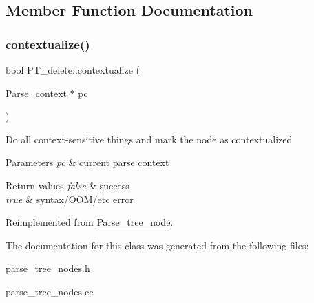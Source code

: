 \subsection{Member Function Documentation}
\mbox{\label{classPT__delete_af4282b73da9ec50c66c814422e7deb06}} 
\subsubsection{\texorpdfstring{contextualize()}{contextualize()}}
{\footnotesize\ttfamily bool P\+T\+\_\+delete\+::contextualize (\begin{DoxyParamCaption}\item[{\mbox{\hyperlink{structParse__context}{Parse\+\_\+context}} $\ast$}]{pc }\end{DoxyParamCaption})\hspace{0.3cm}{\ttfamily [virtual]}}

Do all context-\/sensitive things and mark the node as contextualized


\begin{DoxyParams}{Parameters}
{\em pc} & current parse context\\
\hline
\end{DoxyParams}

\begin{DoxyRetVals}{Return values}
{\em false} & success \\
\hline
{\em true} & syntax/\+O\+O\+M/etc error \\
\hline
\end{DoxyRetVals}


Reimplemented from \mbox{\hyperlink{classParse__tree__node_a22d93524a537d0df652d7efa144f23da}{Parse\+\_\+tree\+\_\+node}}.



The documentation for this class was generated from the following files\+:\begin{DoxyCompactItemize}
\item 
parse\+\_\+tree\+\_\+nodes.\+h\item 
parse\+\_\+tree\+\_\+nodes.\+cc\end{DoxyCompactItemize}
